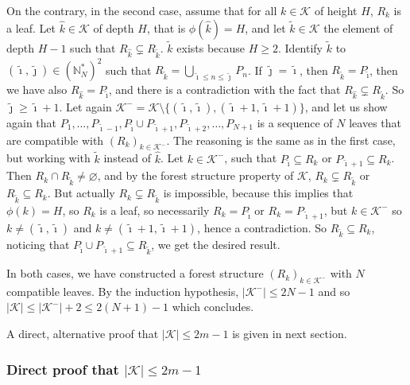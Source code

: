 \documentclass[
  11pt,
  a4paper,
]{article}
\theoremstyle{definition}
\theoremstyle{plain}
\theoremstyle{plain}
\theoremstyle{plain}
\theoremstyle{definition}
\theoremstyle{remark}
\begin{document}
On the contrary, in the second case, assume that for all
\(k\in\mathcal{K}\) of height \(H\), \(R_k\) is a leaf. Let
\(\hat k\in\mathcal{K}\) of depth \(H\), that is \(\phi(\hat k)=H\), and
let \(\tilde k\in\mathcal{K}\) the element of depth \(H-1\) such that
\(R_{\hat k}\subsetneq R_{\tilde k}\). \(\tilde k\) exists because
\(H\geq2\). Identify \(\tilde k\) to
\((\tilde\imath, \tilde\jmath)\in \left(\mathbb N_N^* \right)^2\) such
that \(R_{\tilde k}=\bigcup_{\tilde\imath\leq n\leq \tilde\jmath}P_n\).
If \(\tilde\jmath=\tilde\imath\), then
\(R_{\tilde k}=P_{\tilde\imath}\), then we have also
\(R_{\hat k}=P_{\tilde\imath}\), and there is a contradiction with the
fact that \(R_{\hat k}\subsetneq R_{\tilde k}\). So
\(\tilde\jmath\geq\tilde\imath+1\). Let again
\(\mathcal{K}^-=\mathcal{K}\setminus\{(\tilde\imath, \tilde\imath), (\tilde\imath+1, \tilde\imath+1)\}\),
and let us show again that
\(P_1,\dotsc,P_{\tilde\imath-1}, P_{\tilde\imath}\cup P_{\tilde\imath+1},P_{\tilde\imath+2},\dotsc,P_{N+1}\)
is a sequence of \(N\) leaves that are compatible with
\((R_k)_{k\in\mathcal{K}^-}\). The reasoning is the same as in the first
case, but working with \(\tilde k\) instead of \(\hat k\). Let
\(k\in\mathcal{K}^-\), such that \(P_{\tilde\imath}\subseteq R_k\) or
\(P_{\tilde\imath+1}\subseteq R_k\). Then
\(R_k\cap R_{\tilde k}\neq\varnothing\), and by the forest structure
property of \(\mathcal{K}\), \(R_k\subsetneq R_{\tilde k}\) or
\(R_{\tilde k}\subseteq R_k\). But actually
\(R_k\subsetneq R_{\tilde k}\) is impossible, because this implies that
\(\phi(k)=H\), so \(R_k\) is a leaf, so necessarily
\(R_k=P_{\tilde\imath}\) or \(R_k=P_{\tilde\imath+1}\), but
\(k\in\mathcal{K}^-\) so \(k\neq(\tilde\imath, \tilde\imath)\) and
\(k\neq(\tilde\imath+1, \tilde\imath+1)\), hence a contradiction. So
\(R_{\tilde k}\subseteq R_k\), noticing that
\(P_{\tilde\imath}\cup P_{\tilde\imath+1}\subseteq R_{\tilde k}\), we
get the desired result.

In both cases, we have constructed a forest structure
\((R_k)_{k\in\mathcal{K}^-}\) with \(N\) compatible leaves. By the
induction hypothesis, \(|\mathcal{K}^-|\leq 2N-1\) and so
\(|\mathcal{K}|\leq|\mathcal{K}^-|+2\leq 2(N+1)-1\) which concludes.

A direct, alternative proof that \(|\mathcal{K}|\leq 2m-1\) is given in
next section.

\subsubsection{\texorpdfstring{Direct proof that
\(|\mathcal{K}|\leq 2m-1\)}{Direct proof that \textbar\textbackslash mathcal\{K\}\textbar\textbackslash leq 2m-1}}\label{direct-proof-that-mathcalkleq-2m-1}
\end{document}
